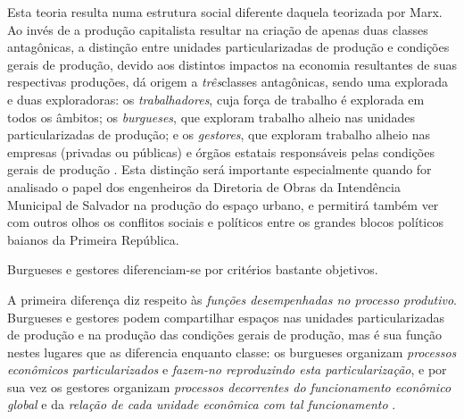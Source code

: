 Esta teoria resulta numa estrutura social diferente daquela teorizada por Marx. Ao invés de a produção capitalista resultar na criação de apenas duas classes antagônicas, a distinção entre unidades particularizadas de produção e condições gerais de produção, devido aos distintos impactos na economia resultantes de suas respectivas produções, dá origem a \textit{três}classes antagônicas, sendo uma explorada e duas exploradoras: os \textit{trabalhadores}, cuja força de trabalho é explorada em todos os âmbitos; os \textit{burgueses}, que exploram trabalho alheio nas unidades particularizadas de produção; e os \textit{gestores}, que exploram trabalho alheio nas empresas (privadas ou públicas) e órgãos estatais responsáveis pelas condições gerais de produção \cite[p.~202]{BERNARDO1991}. Esta distinção será importante especialmente quando for analisado o papel dos engenheiros da Diretoria de Obras da Intendência Municipal de Salvador na produção do espaço urbano, e permitirá também ver com outros olhos os conflitos sociais e políticos entre os grandes blocos políticos baianos da Primeira República.

Burgueses e gestores diferenciam-se por critérios bastante objetivos.

A primeira diferença diz respeito às \textit{funções desempenhadas no processo produtivo}. Burgueses e gestores podem compartilhar espaços nas unidades particularizadas de produção e na produção das condições gerais de produção, mas é sua função nestes lugares que as diferencia enquanto classe: os burgueses organizam \textit{processos econômicos particularizados} e \textit{fazem-no reproduzindo esta particularização}, e por sua vez os gestores organizam \textit{processos decorrentes do funcionamento econômico global} e da \textit{relação de cada unidade econômica com tal funcionamento} \cite[p.~203-204]{BERNARDO1991}. 

